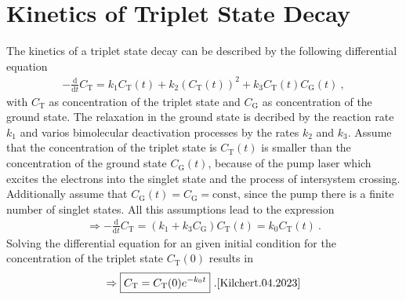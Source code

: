 \newpage
\section{Kinetics of Triplet State Decay}
\label{sec:decay}

The kinetics of a triplet state decay can be described by the following differential equation
\begin{gather}
    -\frac{\mathrm{d}}{\mathrm{d}t} C_\mathrm{T} = k_1 C_\mathrm{T}(t) + k_2(C_\mathrm{T}(t))^2 + k_3C_\mathrm{T}(t)C_\mathrm{G}(t)~,
    \label{eq:kinetics}
\end{gather}
with $C_\mathrm{T}$ as concentration of the triplet state and $C_\mathrm{G}$ as concentration of the ground state. The relaxation in the ground state is decribed by the reaction rate $k_1$ and varios bimolecular deactivation processes by the rates $k_2$ and $k_3$. Assume that the concentration of the triplet state is $C_\mathrm{T}(t)$ is smaller than the concentration of the ground state $C_\mathrm{G}(t)$, because of the pump laser which excites the electrons into the singlet state and the process of intersystem crossing. Additionally assume that $C_\mathrm{G}(t) = C_\mathrm{G} = \mathrm{const}$, since the pump there is a finite number of singlet states. All this assumptions lead to the expression
\begin{gather}
    \Rightarrow -\frac{\mathrm{d}}{\mathrm{d}t} C_\mathrm{T} = (k_1  + k_3C_\mathrm{G})C_\mathrm{T}(t) = k_0 C_\mathrm{T}(t)~.
    \label{eq:kineticsReduced}
\end{gather}
Solving the differential equation for an given initial condition for the concentration of the triplet state $C_\mathrm{T}(0)$ results in 
\begin{gather}
    \Rightarrow \boxed{C_\mathrm{T} = C_\mathrm{T}(0) e^{-k_0t}}~.\cite{Kilchert.04.2023}
    \label{eq:kineticsSolved}
\end{gather}